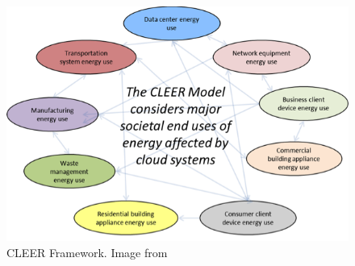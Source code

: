\begin{figure} [!h]
\centering
\includegraphics[scale=.5]{methodology/images/cleer_diagram.png}
\caption[Storage Servers]{CLEER Framework.  Image from \cite{}}
\label{img_cleer}
\end{figure}